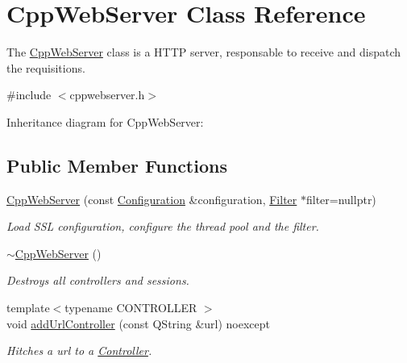 \hypertarget{class_cpp_web_server}{}\section{Cpp\+Web\+Server Class Reference}
\label{class_cpp_web_server}


The \hyperlink{class_cpp_web_server}{Cpp\+Web\+Server} class is a H\+T\+TP server, responsable to receive and dispatch the requisitions.  




{\ttfamily \#include $<$cppwebserver.\+h$>$}



Inheritance diagram for Cpp\+Web\+Server\+:
\subsection*{Public Member Functions}
\begin{DoxyCompactItemize}
\item 
\hyperlink{class_cpp_web_server_a9c5598c541de45a40d2ebad698e9a616}{Cpp\+Web\+Server} (const \hyperlink{class_configuration}{Configuration} \&configuration, \hyperlink{class_filter}{Filter} $\ast$filter=nullptr)
\begin{DoxyCompactList}\small\item\em Load S\+SL configuration, configure the thread pool and the filter. \end{DoxyCompactList}\item 
\mbox{\label{class_cpp_web_server_a6b9d6874d16f6491c511fb4b8793a5f8}} 
\hyperlink{class_cpp_web_server_a6b9d6874d16f6491c511fb4b8793a5f8}{$\sim$\+Cpp\+Web\+Server} ()
\begin{DoxyCompactList}\small\item\em Destroys all controllers and sessions. \end{DoxyCompactList}\item 
{\footnotesize template$<$typename C\+O\+N\+T\+R\+O\+L\+L\+ER $>$ }\\void \hyperlink{class_cpp_web_server_ab876ae8eb6d14b89b9f0a76739c1545d}{add\+Url\+Controller} (const Q\+String \&url) noexcept
\begin{DoxyCompactList}\small\item\em Hitches a url to a \hyperlink{class_controller}{Controller}. \end{DoxyCompactList}\end{DoxyCompactItemize}
